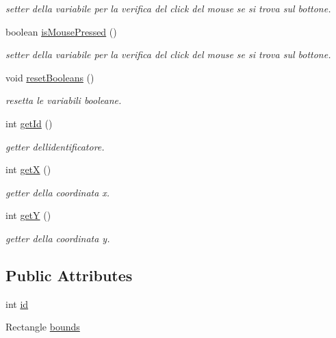 \begin{DoxyCompactItemize}
\begin{DoxyCompactList}\small\item\em setter della variabile per la verifica del click del mouse se si trova sul bottone. \end{DoxyCompactList}\item 
boolean \hyperlink{classui_1_1_my_button_ad47389f2ab3067af3626db75a6b3b09e}{is\+Mouse\+Pressed} ()
\begin{DoxyCompactList}\small\item\em setter della variabile per la verifica del click del mouse se si trova sul bottone. \end{DoxyCompactList}\item 
void \hyperlink{classui_1_1_my_button_af47bcfe7d6d4ed3655e2c61583e1b5d7}{reset\+Booleans} ()
\begin{DoxyCompactList}\small\item\em resetta le variabili booleane. \end{DoxyCompactList}\item 
int \hyperlink{classui_1_1_my_button_a67283be3f45257d1e0c474c563ebb6b6}{get\+Id} ()
\begin{DoxyCompactList}\small\item\em getter dell\textquotesingle{}identificatore. \end{DoxyCompactList}\item 
int \hyperlink{classui_1_1_my_button_ae13f88e922e1339355456062ad9fa359}{getX} ()
\begin{DoxyCompactList}\small\item\em getter della coordinata x. \end{DoxyCompactList}\item 
int \hyperlink{classui_1_1_my_button_aab81944f0a14bba932c0931899951937}{getY} ()
\begin{DoxyCompactList}\small\item\em getter della coordinata y. \end{DoxyCompactList}\end{DoxyCompactItemize}
\subsection*{Public Attributes}
\begin{DoxyCompactItemize}
\item 
int \hyperlink{classui_1_1_my_button_a7441ef0865bcb3db9b8064dd7375c1ea}{id}
\item 
Rectangle \hyperlink{classui_1_1_my_button_a62df0866a4faf552c81108aff64e8eff}{bounds}
\end{DoxyCompactItemize}
